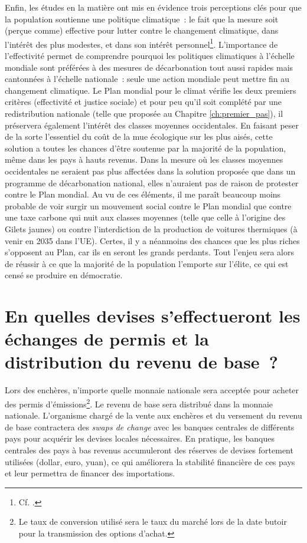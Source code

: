 \documentclass[a5paper,french]{memoir}
\begin{document}
Enfin, les études en la matière ont mis en évidence trois perceptions clés pour que la population soutienne une politique climatique~: le fait que la mesure soit (perçue comme) effective pour lutter contre le changement climatique, dans l'intérêt des plus modestes, et dans son intérêt personnel\footnote{Cf. \cite{dechezlepretre_fighting_2022}.}. L'importance de l'effectivité permet de comprendre pourquoi les politiques climatiques à l'échelle mondiale sont préférées à des mesures de décarbonation tout aussi rapides mais cantonnées à l'échelle nationale~: seule une action mondiale peut mettre fin au changement climatique. Le Plan mondial pour le climat vérifie les deux premiers critères (effectivité et justice sociale) et pour peu qu'il soit complété par une redistribution nationale (telle que proposée au Chapitre \ref{ch:premier_pas}), il préservera également l'intérêt des classes moyennes occidentales. En faisant peser de la sorte l'essentiel du coût de la mue écologique sur les plus aisés, cette solution a toutes les chances d'être soutenue par la majorité de la population, même dans les pays à hauts revenus. Dans la mesure où les classes moyennes occidentales ne seraient pas plus affectées dans la solution proposée que dans un programme de décarbonation national, elles n'auraient pas de raison de protester contre le Plan mondial. Au vu de ces éléments, il me paraît beaucoup moins probable de voir surgir un mouvement social contre le Plan mondial que contre une taxe carbone qui nuit aux classes moyennes (telle que celle à l'origine des Gilets jaunes) ou contre l'interdiction de la production de voitures thermiques (à venir en 2035 dans l'UE). Certes, il y a néanmoins des chances que les plus riches s'opposent au Plan, car ils en seront les grands perdants. Tout l'enjeu sera alors de réussir à ce que la majorité de la population l'emporte sur l'élite, ce qui est censé se produire en démocratie.


\section*{\normalsize En quelles devises s'effectueront les échanges de permis et la distribution du revenu de base~?}\label{q:devise}

Lors des enchères, n'importe quelle monnaie nationale sera acceptée pour acheter des permis d'émissions\footnote{Le taux de conversion utilisé sera le taux du marché lors de la date butoir pour la transmission des options d'achat.}. Le revenu de base sera distribué dans la monnaie nationale. L'organisme chargé de la vente aux enchères et du versement du revenu de base contractera des \textit{swaps de change} avec les banques centrales de différents pays pour acquérir les devises locales nécessaires. En pratique, les banques centrales des pays à bas revenus accumuleront des réserves de devises fortement utilisées (dollar, euro, yuan), ce qui améliorera la stabilité financière de ces pays et leur permettra de financer des importations.
\end{document}
